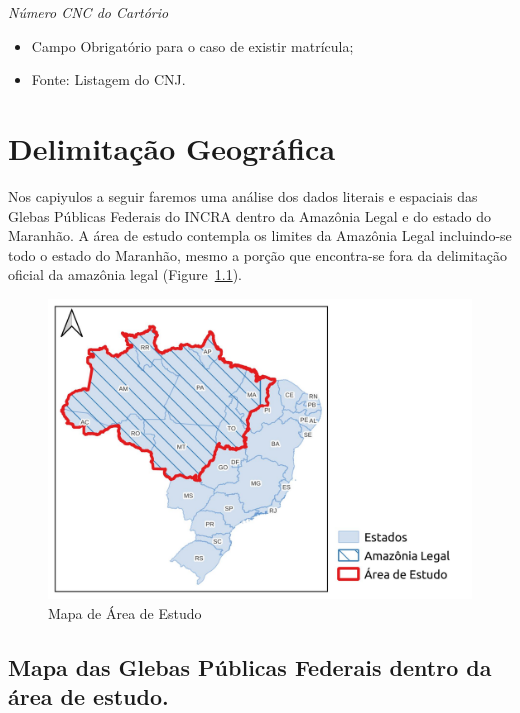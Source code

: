 \documentclass[
  letterpaper,
]{report}
\providecommand{\tightlist}{%
  \setlength{\itemsep}{0pt}\setlength{\parskip}{0pt}}\usepackage{longtable,booktabs,array}
\begin{document}
\emph{Número CNC do Cartório}

\begin{itemize}
\tightlist
\item
  Campo Obrigatório para o caso de existir matrícula;
\item
  Fonte: Listagem do CNJ.
\end{itemize}


\hypertarget{delimitauxe7uxe3o-geogruxe1fica}{%
\chapter{Delimitação Geográfica}\label{delimitauxe7uxe3o-geogruxe1fica}}

Nos capiyulos a seguir faremos uma análise dos dados literais e
espaciais das Glebas Públicas Federais do INCRA dentro da Amazônia Legal
e do estado do Maranhão. A área de estudo contempla os limites da
Amazônia Legal incluindo-se todo o estado do Maranhão, mesmo a porção
que encontra-se fora da delimitação oficial da amazônia legal
(Figure~\ref{fig-area-estudo}).

\begin{figure}[H]

{\centering \includegraphics{././img/a6-geral.jpg}

}

\caption{\label{fig-area-estudo}Mapa de Área de Estudo}

\end{figure}

\hypertarget{mapa-das-glebas-puxfablicas-federais-dentro-da-uxe1rea-de-estudo.}{%
\section{Mapa das Glebas Públicas Federais dentro da área de
estudo.}\label{mapa-das-glebas-puxfablicas-federais-dentro-da-uxe1rea-de-estudo.}}
\end{document}
